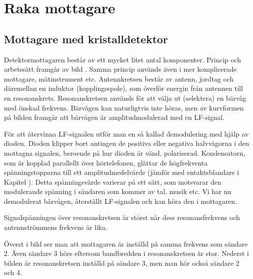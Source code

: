 \section{Raka mottagare}

\subsection{Mottagare med kristalldetektor}


Detektormottagaren består av ett mycket litet antal komponenter.
Princip och arbetssätt framgår av bild .
Samma princip används även i mer komplicerade mottagare, mätinstrument etc.
Antennkretsen består av antenn, jordtag och däremellan en induktor
(kopplingsspole), som överför energin från antennen till en resonanskrets.
Resonanskretsen används för att välja ut (selektera) en bärvåg med önskad
frekvens.
Bärvågen kan naturligtvis inte höras, men av kurvformen på bilden framgår
att bärvågen är amplitudmodulerad med en LF-signal.

För att återvinna LF-signalen utför man en så kallad demodulering med hjälp
av dioden.
Dioden klipper bort antingen de positiva eller negativa halvvågorna i den
mottagna signalen, beroende på hur dioden är vänd, polariserad.
Kondensatorn, som är kopplad parallellt över hörtelefonen, glättar de
högfrekventa spänningstopparna till ett amplitudmedelvärde (jämför med
entaktsblandare i Kapitel ).
Detta spänningsvärde varierar på ett sätt, som motsvarar den modulerande
spänning i sändaren som kommer av tal, musik etc.
Vi har nu demodulerat bärvågen, återställt LF-signalen och kan höra den i
mottagaren.

Signalspänningen över resonanskretsen är störst när dess resonansfrekvens och
antennströmmens frekvens är lika.

{}

Överst i bild  ser man att mottagaren är inställd på
samma frekvens som sändare 2.
Även sändare 3 hörs eftersom bandbredden i resonanskretsen är stor.
Nederst i bilden är resonanskretsen inställd på sändare 3, men man hör
också sändare 2 och 4.

